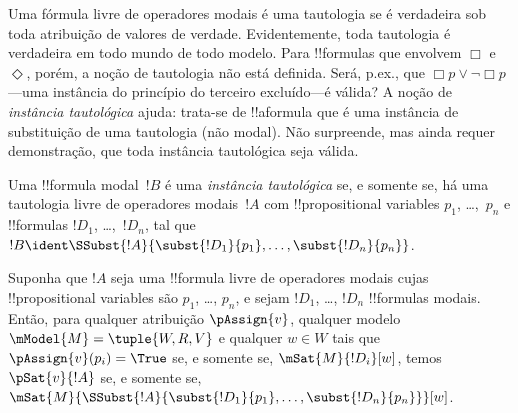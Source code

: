 \documentclass[../../../include/open-logic-section]{subfiles}
\begin{document}


\begin{explain}
Uma fórmula livre de operadores modais é uma tautologia se é verdadeira
sob toda atribuição de valores de verdade. Evidentemente, toda tautologia
é verdadeira em todo mundo de todo modelo. Para !!{formula}s que envolvem
$\Box$ e~$\Diamond$, porém, a noção de tautologia não está definida. Será,
p.ex., que $\Box p \lor \lnot \Box p$---uma instância do princípio
do terceiro excluído---é válida? A noção de \emph{instância tautológica}
ajuda: trata-se de !!a{formula} que é uma instância de substituição de uma
tautologia (não modal). Não surpreende, mas ainda requer demonstração, que
toda instância tautológica seja válida.
\end{explain}

\begin{defn}
  Uma !!{formula} modal~$!B$ é uma \emph{instância tautológica} se, e
  somente se, há uma tautologia livre de operadores modais~$!A$ com
  !!{propositional variable}s $p_1$, \dots,~$p_n$ e !!{formula}s $!D_1$,
  \dots,~$!D_n$, tal que $!B \ident \SSubst{!A}{\subst{!D_1}{p_1},
    \dots, \subst{!D_n}{p_n}}$.
\end{defn}

\begin{lem}
  Suponha que $!A$ seja uma !!{formula} livre de operadores modais cujas
  !!{propositional variable}s são $p_1$, \dots, $p_n$, e sejam $!D_1$,
  \dots, $!D_n$ !!{formula}s modais. Então, para qualquer atribuição
  $\pAssign{v}$, qualquer modelo $\mModel{M} = \tuple{W, R, V}$ e qualquer
  $w \in W$ tais que $\pAssign{v}(p_i) = \True$ se, e somente se,
  $\mSat{M}{!D_i}[w]$, temos $\pSat{v}{!A}$ se, e somente se,
  $\mSat{M}{\SSubst{!A}{\subst{!D_1}{p_1}, \dots,
      \subst{!D_n}{p_n}}}[w]$.
\end{lem}
\end{document}
